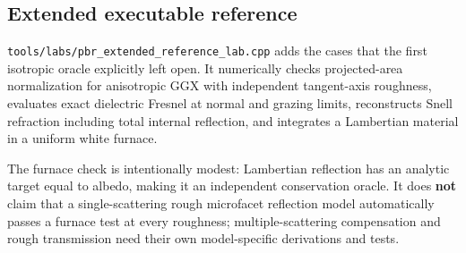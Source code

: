 \subsection{Extended executable reference}\label{appendix-885c1cb64ae9-extended-executable-reference}

\hypertarget{appendix-885c1cb64ae9-extended-executable-reference}{}

\texttt{tools/labs/pbr\_extended\_reference\_lab.cpp} adds the cases that the first isotropic oracle explicitly left open. It numerically checks projected-area normalization for anisotropic GGX with independent tangent-axis roughness, evaluates exact dielectric Fresnel at normal and grazing limits, reconstructs Snell refraction including total internal reflection, and integrates a Lambertian material in a uniform white furnace.

The furnace check is intentionally modest: Lambertian reflection has an analytic target equal to albedo, making it an independent conservation oracle. It does \textbf{not} claim that a single-scattering rough microfacet reflection model automatically passes a furnace test at every roughness; multiple-scattering compensation and rough transmission need their own model-specific derivations and tests.
